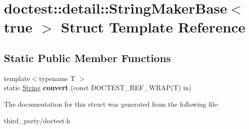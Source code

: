 \hypertarget{structdoctest_1_1detail_1_1_string_maker_base_3_01true_01_4}{}\section{doctest\+::detail\+::String\+Maker\+Base$<$ true $>$ Struct Template Reference}
\label{structdoctest_1_1detail_1_1_string_maker_base_3_01true_01_4}
\subsection*{Static Public Member Functions}
\begin{DoxyCompactItemize}
\item 
\mbox{\label{structdoctest_1_1detail_1_1_string_maker_base_3_01true_01_4_ae1a11dee413117f36e335677589b047f}} 
{\footnotesize template$<$typename T $>$ }\\static \mbox{\hyperlink{classdoctest_1_1_string}{String}} {\bfseries convert} (const D\+O\+C\+T\+E\+S\+T\+\_\+\+R\+E\+F\+\_\+\+W\+R\+AP(T) in)
\end{DoxyCompactItemize}


The documentation for this struct was generated from the following file\+:\begin{DoxyCompactItemize}
\item 
third\+\_\+party/doctest.\+h\end{DoxyCompactItemize}
